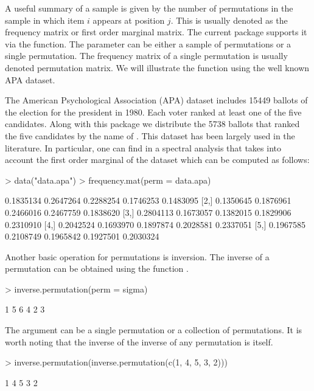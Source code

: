 \documentclass[article,nojss]{jss}
\begin{document}
A useful summary of a sample is given by the number of permutations in the sample in which item $i$ appears at position $j$. This is usually denoted as the frequency matrix or first order marginal matrix. The current package supports it via the  function. The parameter  can be either a sample of permutations or a single permutation. The frequency matrix of a single permutation is usually denoted permutation matrix. We will illustrate the  function using the well known APA dataset. 
 
The American Psychological Association (APA) dataset includes 15449 ballots of the election for the president in 1980. 
Each voter ranked at least one of the five candidates. Along with this package we distribute the 5738 ballots that ranked the five candidates by the name of . This dataset has been largely used in the literature. In particular, one can find in \cite{diaconis1989} a spectral analysis that takes into account the first order marginal of the dataset which can be computed as follows:
\begin{Schunk}
\begin{Sinput}
> data("data.apa")
> frequency.mat(perm = data.apa)
\end{Sinput}
\begin{Soutput}
          [,1]      [,2]      [,3]      [,4]      [,5]
[1,] 0.1835134 0.2647264 0.2288254 0.1746253 0.1483095
[2,] 0.1350645 0.1876961 0.2466016 0.2467759 0.1838620
[3,] 0.2804113 0.1673057 0.1382015 0.1829906 0.2310910
[4,] 0.2042524 0.1693970 0.1897874 0.2028581 0.2337051
[5,] 0.1967585 0.2108749 0.1965842 0.1927501 0.2030324
\end{Soutput}
\end{Schunk}

Another basic operation for permutations is inversion. The inverse of a permutation can be obtained using the function .
\begin{Schunk}
\begin{Sinput}
> inverse.permutation(perm = sigma)
\end{Sinput}
\begin{Soutput}
[1] 1 5 6 4 2 3
\end{Soutput}
\end{Schunk}

The argument   can be a single permutation or a collection of permutations. It is worth noting that the inverse of the inverse of any permutation is itself.
\begin{Schunk}
\begin{Sinput}
> inverse.permutation(inverse.permutation(c(1, 4, 5, 3, 2)))
\end{Sinput}
\begin{Soutput}
[1] 1 4 5 3 2
\end{Soutput}
\end{Schunk}
\end{document}
